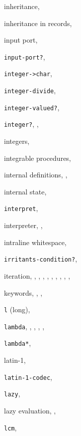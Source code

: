 {\begin{multicols}{2}
inheritance, \pageref{examples_s67}
  
inheritance in records, \pageref{records_s8}
  
input port, \pageref{io_s1}
  
\texttt{input-port?}, \textit{\pageref{io_s44}}
  
\texttt{integer-\textgreater{}char}, \textit{\pageref{objects_s211}}
  
\texttt{integer-divide}, \pageref{further_s73}
  
\texttt{integer-valued?}, \textit{\pageref{objects_s18}}
  
\texttt{integer?}, \textit{\pageref{objects_s17}}, \pageref{objects_s68}
  
integers, \pageref{objects_s64}
  
integrable procedures, \pageref{syntax_s60}
  
internal definitions, \pageref{further_s81}, \pageref{binding_s6}
  
internal state, \pageref{start_s167}
  
\texttt{interpret}, \pageref{examples_s46}
  
interpreter, \pageref{intro_s8}, \pageref{examples_s48}
  
intraline whitespace, \pageref{grammar_s4}
  
\texttt{irritants-condition?}, \textit{\pageref{exceptions_s25}}
  
iteration, \pageref{intro_s21}, \pageref{start_s145}, \pageref{further_s43}, \pageref{control_s22}, \pageref{control_s26}, \pageref{control_s32}, \pageref{control_s35}, \pageref{control_s40}, \pageref{control_s43}, \pageref{control_s49}
  
keywords, \pageref{intro_s11}, \pageref{further_s15}, \pageref{syntax_s11}
  
\texttt{l} (long), \pageref{objects_s85}
  
\texttt{lambda}, \pageref{start_s60}, \pageref{start_s71}, \pageref{further_s6}, \textit{\pageref{binding_s3}}, \pageref{binding_s9}
  
\texttt{lambda*}, \pageref{binding_s12}
  
latin-1, \pageref{io_s11}
  
\texttt{latin-1-codec}, \textit{\pageref{io_s22}}
  
\texttt{lazy}, \pageref{start_s172}
  
lazy evaluation, \pageref{start_s171}, \pageref{control_s64}
  
\texttt{lcm}, \textit{\pageref{objects_s110}}
  

\end{multicols}}
